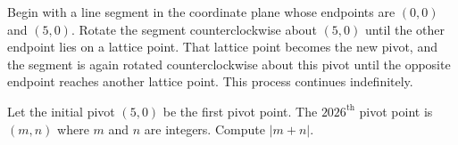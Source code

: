 Begin with a line segment in the coordinate plane whose endpoints are $(0,0)$ and $(5,0)$. Rotate the segment counterclockwise about $(5,0)$ until the other endpoint lies on a lattice point. That lattice point becomes the new pivot, and the segment is again rotated counterclockwise about this pivot until the opposite endpoint reaches another lattice point. This process continues indefinitely.

Let the initial pivot $(5,0)$ be the first pivot point. The $2026^{\textrm{th}}$ pivot point is $(m,n)$ where $m$ and $n$ are integers. Compute $|m+n|$.
